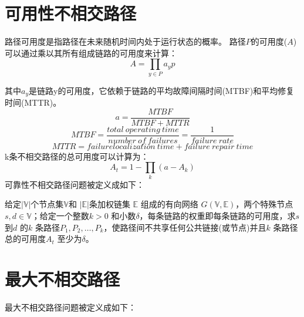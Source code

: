 \section{可用性不相交路径}
路径可用度是指路径在未来随机时间内处于运行状态的概率\cite{clouqueur2002availability}。 路径$P$的可用度($A$) 可以通过乘以其所有组成链路的可用度来计算：
\begin{equation}
A=\prod_{y\in P}a_yp
\end{equation}

其中$a_y$是链路y的可用度，它依赖于链路的平均故障间隔时间(MTBF)和平均修复时间(MTTR)。
\begin{equation}
a=\frac{MTBF}{MTBF+MTTR}
\end{equation}
\begin{equation}
MTBF=\frac{total\ operating\ time}{number\ of\ failures}=\frac{1}{failure\ rate}
\end{equation}
\begin{equation}
MTTR=failure localization\ time+failure\ repair\ time
\end{equation}
k条不相交路径的总可用度可以计算为：
\begin{equation}
A_t=1-\prod_k(a-A_k)
\end{equation}
可靠性不相交路径问题被定义成如下：

\begin{definition}[可用性不相交路径]
给定$|\mathbb{V}|$个节点集$\mathbb{V}$和 $|\mathbb{E}|$条加权链集 $\mathbb{E}$ 组成的有向网络 $G(\mathbb{V},\mathbb{E})$，两个特殊节点$s,d\in\mathbb{V}$；给定一个整数$k>0$ 和小数$\delta$，每条链路的权重即每条链路的可用度，求$s$ 到$d$ 的$k$ 条路径$P_1,P_2,\ldots,P_k$，使路径间不共享任何公共链接(或节点)并且$k$ 条路径总的可用度$A_t$ 至少为$\delta$。


\end{definition}
\section{最大不相交路径}
最大不相交路径问题被定义成如下：

